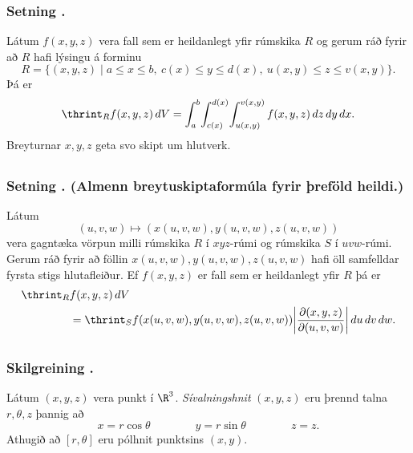 \subsubsection{Setning \kaflanr.}
 Látum $f(x,y,z)$ vera fall sem er heildanlegt yfir rúmskika $R$ og gerum ráð fyrir að $R$ hafi lýsingu á forminu
$$R=\{(x,y,z)\mid a\leq x\leq b,\ c(x)\leq y\leq d(x),\ u(x,y)\leq z\leq v(x,y)\}.$$
Þá er
$$\thrint_R f(x,y,z)\,dV=
\int_a^b\!\int_{c(x)}^{d(x)}\!\int_{u(x,y)}^{v(x,y)} f(x,y,z)\,dz\,dy\,dx.$$ 
Breyturnar $x, y, z$ geta svo skipt um hlutverk.




\subsection{} 

\subsubsection{Setning \kaflanr. (Almenn breytuskiptaformúla fyrir þreföld heildi.) }
 Látum 
$$(u,v,w)\mapsto (x(u,v,w), y(u,v,w), z(u,v,w))$$
vera gagntæka vörpun milli rúmskika $R$ í $xyz$-rúmi og rúmskika $S$ í $uvw$-rúmi.  Gerum ráð fyrir að föllin $x(u,v,w), y(u,v,w), z(u,v,w)$ hafi öll samfelldar fyrsta stigs hlutafleiður.  Ef $f(x,y,z)$ er fall sem er heildanlegt yfir $R$ þá er
\begin {align*}
\thrint_R& f(x,y,z)\,dV \\&=\thrint_S f(x(u,v,w), y(u,v,w), z(u,v,w))
\bigg|\frac{\partial(x,y,z)}{\partial(u,v,w)}\bigg|\,du\,dv\,dw.
\end {align*}




\subsection{} 

\subsubsection{Skilgreining \kaflanr.}
 Látum $(x,y,z)$ vera punkt í $\R^3$.  {\em Sívalningshnit} $(x,y,z)$ eru þrennd talna $r, \theta, z$ þannig að 
$$x=r\cos\theta\qquad\qquad y=r\sin\theta\qquad\qquad z=z.$$
Athugið að $[r,\theta]$ eru pólhnit punktsins $(x,y)$. 




